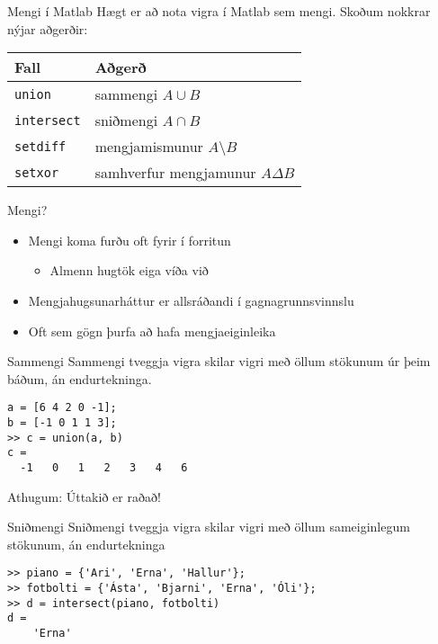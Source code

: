 \documentclass[handout]{beamer}
\begin{document}
\begin{frame}{Mengi í Matlab}
Hægt er að nota vigra í Matlab sem mengi. Skoðum nokkrar nýjar aðgerðir:
\begin{center}
\begin{tabular}{ll}
\toprule
Fall&Aðgerð\\
\midrule
\texttt{union}&sammengi $A \cup B$\\
\texttt{intersect}&sniðmengi $A \cap B$\\
\texttt{setdiff}&mengjamismunur $ A \setminus B$\\
\texttt{setxor}&samhverfur mengjamunur $A \Delta B$\\
\bottomrule
\end{tabular}
\end{center}
\end{frame}

\begin{frame}{Mengi?}
\begin{itemize}
 \item Mengi koma furðu oft fyrir í forritun
 \begin{itemize}
  \item Almenn hugtök eiga víða við
 \end{itemize}
 \item Mengjahugsunarháttur er allsráðandi í gagnagrunnsvinnslu
 \item Oft sem gögn þurfa að hafa mengjaeiginleika
\end{itemize}
\end{frame}


\begin{frame}[fragile]{Sammengi}
Sammengi tveggja vigra skilar vigri með öllum stökunum úr þeim báðum, án endurtekninga.
\begin{verbatim}
a = [6 4 2 0 -1];
b = [-1 0 1 1 3];
>> c = union(a, b)
c =
  -1   0   1   2   3   4   6
\end{verbatim}
Athugum: Úttakið er raðað!
\end{frame}

\begin{frame}[fragile]{Sniðmengi}
Sniðmengi tveggja vigra skilar vigri með öllum sameiginlegum stökunum, án endurtekninga
\begin{verbatim}
>> piano = {'Ari', 'Erna', 'Hallur'};
>> fotbolti = {'Ásta', 'Bjarni', 'Erna', 'Óli'};
>> d = intersect(piano, fotbolti)
d = 
    'Erna'
\end{verbatim}
\end{frame}
\end{document}
